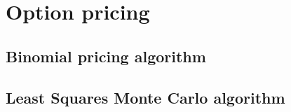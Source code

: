 
\section{Option pricing}


\subsection{Binomial pricing algorithm}


\subsection{Least Squares Monte Carlo algorithm}


